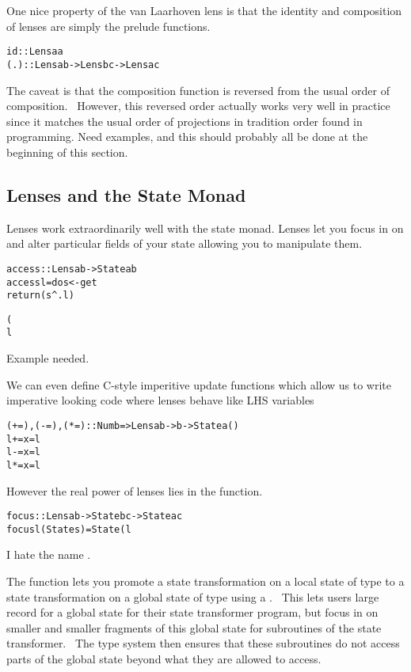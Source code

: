 \documentclass{article}
\newcommand{\tmtexttt}[1]{{\ttfamily{#1}}}
\begin{document}
One nice property of the van Laarhoven lens is that the identity and
composition of lenses are simply the prelude functions.
\begin{alltt}
id :: Lens a a
(.) :: Lens a b -> Lens b c -> Lens a c
\end{alltt}


The caveat is that the composition function is reversed from the usual order
of composition. \ However, this reversed order actually works very well in
practice since it matches the usual order of projections in tradition order
found in programming. {\color{red} Need examples, and this should probably all
be done at the beginning of this section.}

\subsection{Lenses and the State Monad}

Lenses work extraordinarily well with the state monad. Lenses let you focus in
on and alter particular fields of your state allowing you to manipulate them.


\begin{alltt}
access :: Lens a b -> State a b
access l = do s <- get
              return (s^.l)

(%=) :: Lens a b -> b -> State a ()
l %= x = modify (l %~ b)
\end{alltt}


{\color{red} Example needed.}



We can even define C-style imperitive update functions which allow us to write
imperative looking code where lenses behave like LHS variables


\begin{alltt}
(+=), (-=), (*=) :: Num b => Lens a b -> b -> State a ()
l += x = l %= (+ x)
l -= x = l %= (subtract x)
l *= x = l %= (* x)
\end{alltt}


However the real power of lenses lies in the \tmtexttt{focus} function.


\begin{alltt}
focus :: Lens a b -> State b c -> State a c
focus l (State s) = State (l %%= s)
\end{alltt}
{\color{red} I hate the name \tmtexttt{\%\%=}.}



The \tmtexttt{focus} function lets you promote a state transformation on a
local state of type \tmtexttt{b} to a state transformation on a global state
of type \tmtexttt{a} using a \tmtexttt{Lens a b}. \ This lets users large
record for a global state for their state transformer program, but focus in on
smaller and smaller fragments of this global state for subroutines of the
state transformer. \ The type system then ensures that these subroutines do
not access parts of the global state beyond what they are allowed to access.
\end{document}
